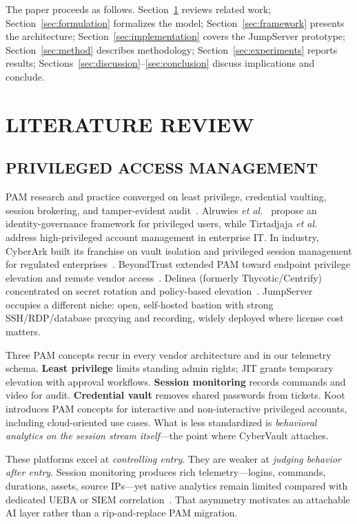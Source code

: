 \documentclass{ieeeaccess}
\begin{document}
The paper proceeds as follows. Section~\ref{sec:related} reviews related work; Section~\ref{sec:formulation} formalizes the model; Section~\ref{sec:framework} presents the architecture; Section~\ref{sec:implementation} covers the JumpServer prototype; Section~\ref{sec:method} describes methodology; Section~\ref{sec:experiments} reports results; Sections~\ref{sec:discussion}--\ref{sec:conclusion} discuss implications and conclude.

\section{LITERATURE REVIEW}
\label{sec:related}

\subsection{PRIVILEGED ACCESS MANAGEMENT}
PAM research and practice converged on least privilege, credential vaulting, session brokering, and tamper-evident audit~\cite{ref1,ref2,ref4,ref26}. Alruwies \textit{et al.}~\cite{ref1} propose an identity-governance framework for privileged users, while Tirtadjaja \textit{et al.}~\cite{ref2} address high-privileged account management in enterprise IT. In industry, CyberArk built its franchise on vault isolation and privileged session management for regulated enterprises~\cite{ref16}. BeyondTrust extended PAM toward endpoint privilege elevation and remote vendor access~\cite{ref17}. Delinea (formerly Thycotic/Centrify) concentrated on secret rotation and policy-based elevation~\cite{ref18}. JumpServer~\cite{ref5} occupies a different niche: open, self-hosted bastion with strong SSH/RDP/database proxying and recording, widely deployed where license cost matters.

Three PAM concepts recur in every vendor architecture and in our telemetry schema. \textbf{Least privilege} limits standing admin rights; JIT grants temporary elevation with approval workflows. \textbf{Session monitoring} records commands and video for audit. \textbf{Credential vault} removes shared passwords from tickets. Koot~\cite{ref26} introduces PAM concepts for interactive and non-interactive privileged accounts, including cloud-oriented use cases. What is less standardized is \textit{behavioral analytics on the session stream itself}---the point where CyberVault attaches.

These platforms excel at \textit{controlling entry}. They are weaker at \textit{judging behavior after entry}. Session monitoring produces rich telemetry---logins, commands, durations, assets, source IPs---yet native analytics remain limited compared with dedicated UEBA or SIEM correlation~\cite{ref27}. That asymmetry motivates an attachable AI layer rather than a rip-and-replace PAM migration.
\end{document}
